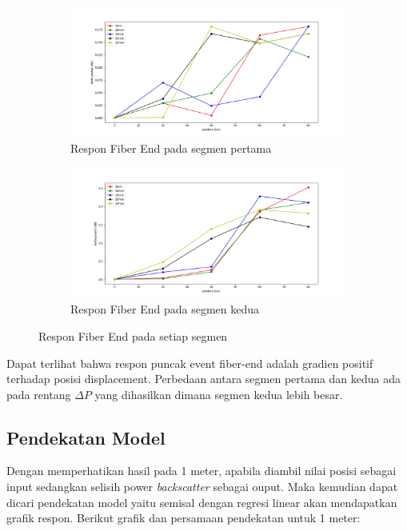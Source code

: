 \documentclass[12pt]{article}
\begin{document}
	\begin{figure}[!ht]
		\centering
		\captionsetup{justification=centering}
		\begin{subfigure}[h]{0.9\textwidth}
			\includegraphics[width=\textwidth]{images/Bab_4/fiber_A_end}	
			\caption{\small{Respon Fiber End pada segmen pertama}}		
		\end{subfigure}
		\begin{subfigure}[h]{0.9\textwidth}
			\includegraphics[width=\linewidth]{images/Bab_4/fiber_B_end}
			\caption{\small{Respon Fiber End pada segmen kedua}}			
		\end{subfigure}
		\caption[belum ada judul]{\small{Respon Fiber End pada setiap segmen}}
	\end{figure}

	Dapat terlihat bahwa respon puncak event fiber-end adalah gradien positif terhadap posisi displacement.
	Perbedaan antara segmen pertama dan kedua ada pada rentang $\Delta P$ yang dihasilkan dimana segmen kedua lebih besar.

\newpage
	\subsection{Pendekatan Model}
	
	Dengan memperhatikan hasil pada 1 meter, apabila diambil nilai posisi sebagai input sedangkan selisih power \textit{backscatter} sebagai ouput.
	Maka kemudian dapat dicari pendekatan model yaitu semisal dengan regresi linear akan mendapatkan grafik respon.
	Berikut grafik dan persamaan pendekatan untuk 1 meter:
	
\end{document}
